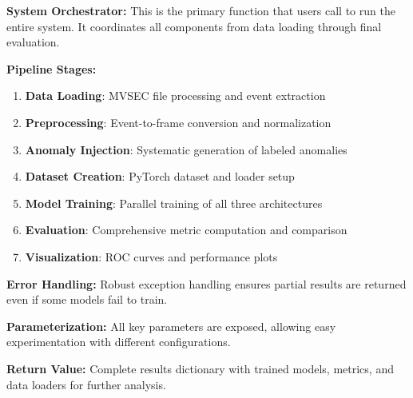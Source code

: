 \documentclass[12pt,a4paper]{article}
\begin{document}
\textbf{System Orchestrator:} This is the primary function that users call to run the entire system. It coordinates all components from data loading through final evaluation.

\textbf{Pipeline Stages:}
\begin{enumerate}
    \item \textbf{Data Loading}: MVSEC file processing and event extraction
    \item \textbf{Preprocessing}: Event-to-frame conversion and normalization
    \item \textbf{Anomaly Injection}: Systematic generation of labeled anomalies
    \item \textbf{Dataset Creation}: PyTorch dataset and loader setup
    \item \textbf{Model Training}: Parallel training of all three architectures
    \item \textbf{Evaluation}: Comprehensive metric computation and comparison
    \item \textbf{Visualization}: ROC curves and performance plots
\end{enumerate}

\textbf{Error Handling:} Robust exception handling ensures partial results are returned even if some models fail to train.

\textbf{Parameterization:} All key parameters are exposed, allowing easy experimentation with different configurations.

\textbf{Return Value:} Complete results dictionary with trained models, metrics, and data loaders for further analysis.
\end{document}
